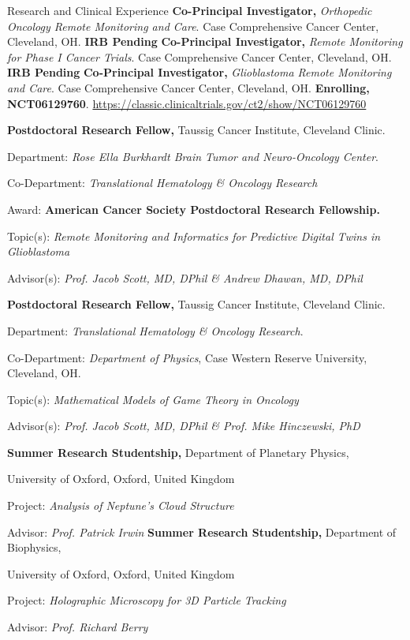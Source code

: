\begin{rubric}{Research and Clinical Experience}
\entry*[2025-]
\textbf{Co-Principal Investigator,} \textit{Orthopedic Oncology Remote Monitoring and Care}. Case Comprehensive Cancer Center, Cleveland, OH. \textbf{IRB Pending}
\entry*[2025-]
\textbf{Co-Principal Investigator,} \textit{Remote Monitoring for Phase I Cancer Trials}. Case Comprehensive Cancer Center, Cleveland, OH. \textbf{IRB Pending}
\entry*[2024-]
\textbf{Co-Principal Investigator,} \textit{Glioblastoma Remote Monitoring and Care}. Case Comprehensive Cancer Center, Cleveland, OH. \textbf{Enrolling, NCT06129760}. \url{https://classic.clinicaltrials.gov/ct2/show/NCT06129760}


%
\entry*[2023-]%
	\textbf{Postdoctoral Research Fellow,} Taussig Cancer Institute, Cleveland Clinic.
     \par Department: \emph{Rose Ella Burkhardt Brain Tumor and Neuro-Oncology Center}. 
  \par Co-Department: \emph{Translational Hematology \& Oncology Research}
\par Award: \textbf{American Cancer Society Postdoctoral Research Fellowship.} 
 \par Topic(s): \emph{Remote Monitoring and Informatics for Predictive  Digital Twins in Glioblastoma}
 \par Advisor(s): \emph{Prof. Jacob Scott,  MD, DPhil \& Andrew Dhawan, MD, DPhil}

%
\entry*[01/2021-23]%
	\textbf{Postdoctoral Research Fellow,} Taussig Cancer Institute, Cleveland Clinic. 
         \par Department: \emph{Translational Hematology \& Oncology Research}.
        \par Co-Department: \emph{Department of Physics}, Case Western Reserve University, Cleveland, OH.
        \par Topic(s): \emph{Mathematical Models of Game Theory in Oncology}
        \par Advisor(s): \emph{Prof. Jacob Scott, MD, DPhil \& Prof. Mike Hinczewski, PhD}

\entry*[2014] \textbf{Summer Research Studentship,} Department of Planetary Physics, \par University of Oxford, Oxford, United Kingdom
\par Project: \emph{Analysis of Neptune's Cloud Structure}
\par Advisor: \emph{Prof. Patrick Irwin}
%
\entry*[2013] \textbf{Summer Research Studentship,} Department of Biophysics, \par University of Oxford, Oxford, United Kingdom
\par Project: \emph{Holographic Microscopy for 3D Particle Tracking}
\par Advisor: \emph{Prof. Richard Berry}
%
\end{rubric}